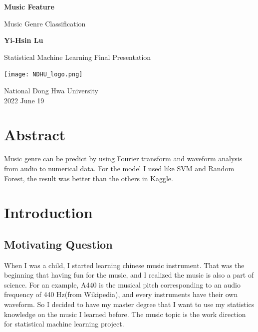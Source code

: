 \documentclass[12pt,a4paper]{article}
\begin{document}
\begin{titlepage}
   \begin{center}
       \vspace*{1cm}

       \textbf{\Huge{Music Feature}}

       \vspace{0.5cm}
        \Large{Music Genre Classification}
            
       \vspace{1.5cm}

       \textbf{Yi-Hsin Lu}

       \vfill
            
        Statistical Machine Learning Final Presentation
            
       \vspace{0.8cm}
     
       \texttt{[image: NDHU\_logo.png]}
            
       National Dong Hwa University\\
       2022 June 19
   \end{center}
\end{titlepage}

\tableofcontents

\newpage

\section*{Abstract}
Music genre can be predict by using Fourier transform and waveform analysis from audio to numerical data. For the model I used like SVM and Random Forest, the result was better than the others in Kaggle.


\section{Introduction}
\subsection{Motivating Question}
When I was a child, I started learning chinese music instrument. That was the beginning that having fun for the music, and I realized the music is also a part of science. For an example, A440 is the musical pitch corresponding to an audio frequency of 440 Hz(from Wikipedia), and every instruments have their own waveform. So I decided to have my master degree that I want to use my statistics knowledge on the music I learned before. The music topic is the work direction for statistical machine learning project.
\end{document}
